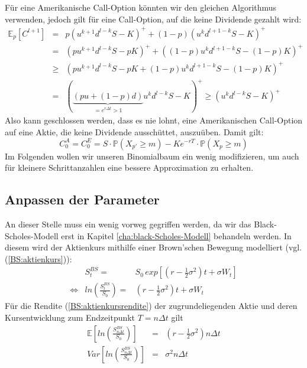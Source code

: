 Für eine Amerikanische Call-Option könnten wir den gleichen Algorithmus verwenden, jedoch gilt für eine Call-Option, auf die keine Dividende gezahlt wird:
\begin{eqnarray*}
\mathbb{E}_p\left[C^{l+1}\right] &=& p\left(u^{k+1}d^{l-k}S-K\right)^+ + \left(1-p\right)\left(u^kd^{l+1-k}S-K\right)^+ \\
                                 &=& \left(pu^{k+1}d^{l-k}S-pK\right)^+ + \left(\left(1-p\right)u^kd^{l+1-k}S-\left(1-p\right)K\right)^+ \\
                                 &\geq & \left(pu^{k+1}d^{l-k}S-pK + \left(1-p\right)u^kd^{l+1-k}S-\left(1-p\right)K\right)^+ \\
                                 &=& \left(\underbrace{\left(pu+\left(1-p\right)d\right)}_{=e^{r\Delta t}>1} u^kd^{l-k}S-K\right)^+ \geq \left(u^kd^{l-k}S-K\right)^+
\end{eqnarray*}
Also kann geschlossen werden, dass es nie lohnt, eine Amerikanischen Call-Option auf eine Aktie, die keine Dividende ausschüttet, auszuüben. Damit gilt:
\begin{equation}
C^A_0 = C^E_0 = S \cdot \mathbb{P}\left(X_{p'} \geq m\right) - Ke^{-rT} \cdot \mathbb{P}\left(X_p \geq m\right)
\end{equation}
Im Folgenden wollen wir unseren Binomialbaum ein wenig modifizieren, um auch für kleinere Schrittanzahlen eine bessere Approximation zu erhalten.



\subsection{Anpassen der Parameter}              %

An dieser Stelle muss ein wenig vorweg gegriffen werden, da wir das Black-Scholes-Modell erst in Kapitel \ref{cha:black-Scholes-Modell} behandeln werden. In diesem wird der Aktienkurs mithilfe einer Brown'schen Bewegung modelliert (vgl. (\ref{BS:aktienkurs})):
\begin{eqnarray}
                & S^{BS}_t =                              & S_0\,exp\left[ \left( r - \tfrac{1}{2}\sigma^2\right)t + \sigma W_t\right] \\
\Leftrightarrow & ln\left(\tfrac{S^{BS}_t}{S_0}\right) = & \left( r - \tfrac{1}{2}\sigma^2\right)t + \sigma W_t \label{BS:aktienkursrendite}
\end{eqnarray}
Für die Rendite (\ref{BS:aktienkursrendite}) der zugrundeliegenden Aktie und deren Kursentwicklung zum Endzeitpunkt $T = n\Delta t$ gilt
\begin{eqnarray}
\mathbb{E}\left[ ln\left(\tfrac{S^{BS}_{n\Delta t}}{S_0}\right) \right] & = & \left( r - \tfrac{1}{2}\sigma^2\right)n\Delta t \label{BS:erwartungswertRendite}\\
Var\left[ ln\left(\tfrac{S^{BS}_{n\Delta t}}{S_0}\right) \right]        & = & \sigma^2n\Delta t \label{BS:varianzRendite}
\end{eqnarray}

